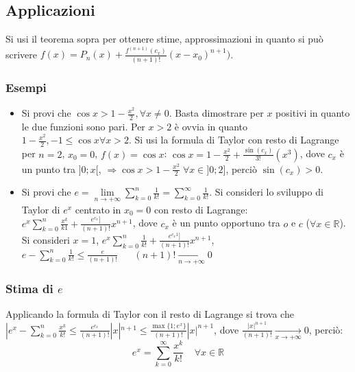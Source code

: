 \subsection{Applicazioni}
Si usi il teorema sopra per ottenere stime, approssimazioni in quanto si pu\`o scrivere $f(x)=P_n(x)+\frac{f^{(n+1)}(c_x)}{(n+1)!}(x-x_0)^{n+1})$.
\subsubsection{Esempi}
\begin{itemize}
\item Si provi che $\cos x>1-\frac{x^2}{2}, \forall x\neq 0$. Basta dimostrare per $x$ positivi in quanto le due funzioni sono pari. Per $x>2$ \`e ovvia in quanto $1-\frac{x^2}
{2},-1\le\cos x \forall x>2$. Si usi la formula di Taylor con resto di Lagrange per $n=2$, $x_0=0$, $f(x)=\cos x$: $\cos x=1-\frac{x^2}{2}+\frac{\sin(c_x)}{3!}(x^3)$, dove $c_x$
\`e un punto tra $]0;x[$, $\Rightarrow \cos x>1-\frac{x^2}{2}\;\forall x\in ]0;2]$, perci\`o $\sin(c_x)>0$.
\item Si provi che $e=\lim\limits_{n\rightarrow+\infty}\sum\limits_{k=0}^n\frac{1}{k!}=\sum\limits_{k=0}^\infty\frac{1}{k!}$. Si consideri lo sviluppo di Taylor di $e^x$ 
centrato in $x_0=0$ con resto di Lagrange: $e^x\sum\limits_{k=0}^n\frac{x^k}{k1}+\frac{e^{c_x}]}{(n+1)!}x^{n+1}$, dove $c_x$ \`e un punto opportuno tra $o$ e $c$ ($\forall x\in
\mathbb{R}$). Si consideri $x=1$, $e^x\sum\limits_{k=0}^n\frac{1}{k!}+\frac{e^{c_x1}]}{(n+1)!}x^{n+1}$, $e-\sum\limits_{k=0}^n\frac{1}{k!}\le \frac{e}{(n+1)!}\;\;\;\;\;\;(n+1)!
\xrightarrow[n\rightarrow+\infty]{}0$
\end{itemize}
\subsubsection{Stima di $e$}
Applicando la formula di Taylor con il resto di Lagrange si trova che $|e^x-\sum\limits_{k=0}^n\frac{x^k}{k!}\le \frac{e^{c_x}}{(n+1)!}|x|^{n+1}\le \frac{\max\{1;e^x\}}{(n+1)!}|x|^{n+1}
$, dove $\frac{|x|^{n+1}}{(n+1)!}\xrightarrow[x\rightarrow+\infty]{}0$, perci\`o:
\begin{equation}
e^x=\sum\limits_{k=0}^\infty \dfrac{x^k}{k!}\;\;\;\;\forall x\in\mathbb{R}
\end{equation}